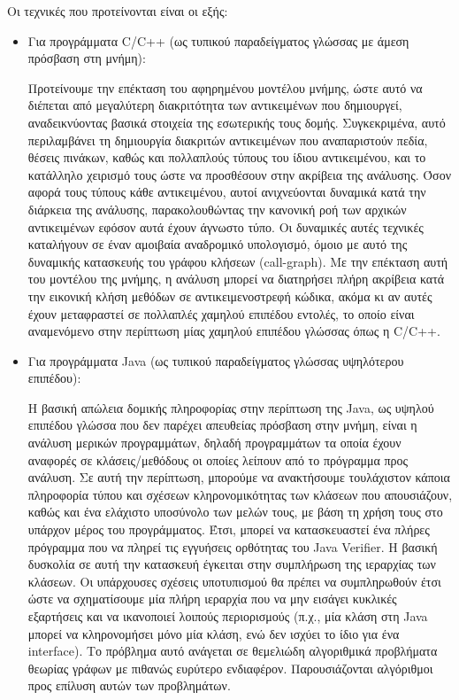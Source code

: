 Οι τεχνικές που προτείνονται είναι οι εξής:
\begin{itemize}
\item Για προγράμματα {\en C/C++} (ως τυπικού παραδείγματος γλώσσας με
  άμεση πρόσβαση στη μνήμη):

  Προτείνουμε την επέκταση του αφηρημένου μοντέλου μνήμης, ώστε αυτό
  να διέπεται από μεγαλύτερη διακριτότητα των αντικειμένων που
  δημιουργεί, αναδεικνύοντας βασικά στοιχεία της εσωτερικής τους
  δομής.  Συγκεκριμένα, αυτό περιλαμβάνει τη δημιουργία διακριτών
  αντικειμένων που αναπαριστούν πεδία, θέσεις πινάκων, καθώς και
  πολλαπλούς τύπους του ίδιου αντικειμένου, και το κατάλληλο χειρισμό
  τους ώστε να προσθέσουν στην ακρίβεια της ανάλυσης.  Όσον αφορά τους
  τύπους κάθε αντικειμένου, αυτοί ανιχνεύονται δυναμικά κατά την
  διάρκεια της ανάλυσης, παρακολουθώντας την κανονική ροή των αρχικών
  αντικειμένων εφόσον αυτά έχουν άγνωστο τύπο.  Οι δυναμικές αυτές
  τεχνικές καταλήγουν σε έναν αμοιβαία αναδρομικό υπολογισμό, όμοιο με
  αυτό της δυναμικής κατασκευής του γράφου κλήσεων ({\en call-graph}).
  Με την επέκταση αυτή του μοντέλου της μνήμης, η ανάλυση μπορεί να
  διατηρήσει πλήρη ακρίβεια κατά την εικονική κλήση μεθόδων σε
  αντικειμενοστρεφή κώδικα, ακόμα κι αν αυτές έχουν μεταφραστεί σε
  πολλαπλές χαμηλού επιπέδου εντολές, το οποίο είναι αναμενόμενο στην
  περίπτωση μίας χαμηλού επιπέδου γλώσσας όπως η {\en C/C++}.
\item Για προγράμματα {\en Java} (ως τυπικού παραδείγματος γλώσσας
  υψηλότερου επιπέδου):

  Η βασική απώλεια δομικής πληροφορίας στην περίπτωση της {\en Java},
  ως υψηλού επιπέδου γλώσσα που δεν παρέχει απευθείας πρόσβαση στην
  μνήμη, είναι η ανάλυση μερικών προγραμμάτων, δηλαδή προγραμμάτων τα
  οποία έχουν αναφορές σε κλάσεις/μεθόδους οι οποίες λείπουν από το
  πρόγραμμα προς ανάλυση.  Σε αυτή την περίπτωση, μπορούμε να
  ανακτήσουμε τουλάχιστον κάποια πληροφορία τύπου και σχέσεων
  κληρονομικότητας των κλάσεων που απουσιάζουν, καθώς και ένα ελάχιστο
  υποσύνολο των μελών τους, με βάση τη χρήση τους στο υπάρχον μέρος
  του προγράμματος.  Έτσι, μπορεί να κατασκευαστεί ένα πλήρες
  πρόγραμμα που να πληρεί τις εγγυήσεις ορθότητας του {\en Java
    Verifier}.  Η βασική δυσκολία σε αυτή την κατασκευή έγκειται στην
  συμπλήρωση της ιεραρχίας των κλάσεων.  Οι υπάρχουσες σχέσεις
  υποτυπισμού θα πρέπει να συμπληρωθούν έτσι ώστε να σχηματίσουμε μία
  πλήρη ιεραρχία που να μην εισάγει κυκλικές εξαρτήσεις και να
  ικανοποιεί λοιπούς περιορισμούς (π.χ., μία κλάση στη {\en Java}
  μπορεί να κληρονομήσει μόνο μία κλάση, ενώ δεν ισχύει το ίδιο για
  ένα {\en interface}).  Το πρόβλημα αυτό ανάγεται σε θεμελιώδη
  αλγοριθμικά προβλήματα θεωρίας γράφων με πιθανώς ευρύτερο
  ενδιαφέρον.  Παρουσιάζονται αλγόριθμοι προς επίλυση αυτών των
  προβλημάτων.


\end{itemize}
